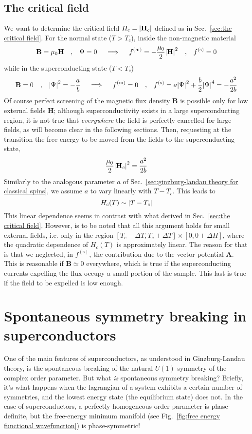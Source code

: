 \subsection{The critical field}

We want to determine the critical field $H_c = \abs{\mathbf{H}_c}$ defined as in Sec.~\ref{sec:the critical field}. For the normal state ($T > T_c$), inside the non-magnetic material
\[
    \mathbf{B} = \mu_0 \mathbf{H}
    \qq{,}
    \Psi = 0
    \quad\implies\quad
    f^{(\mathrm{m})} = - \frac{\mu_0}{2} \abs{\mathbf{H}}^2
    \qq{,}
    f^{(\mathrm{s})} = 0
\]
while in the superconducting state ($T < T_c$)
\[
    \mathbf{B} = 0
    \qq{,}
    \abs{\Psi}^2 = - \frac{a}{b}
    \quad\implies\quad
    f^{(\mathrm{m})} = 0
    \qq{,}
    f^{(\mathrm{s})} = a \abs{\Psi}^2 + \frac{b}{2} \abs{\Psi}^4 = - \frac{a^2}{2b} 
\]
Of course perfect screening of the magnetic flux density $\mathbf{B}$ is possible only for low external fields $\mathbf{H}$; although superconductivity exists in a large superconducting region, it is not true that \textit{everywhere} the field is perfectly cancelled for large fields, as will become clear in the following sections. Then, requesting at the transition the free energy to be moved from the fields to the superconducting state,
\[
     \frac{\mu_0}{2} \abs{\mathbf{H}_c}^2 = \frac{a^2}{2b} 
\]
Similarly to the analogous parameter $a$ of Sec.~\ref{sec:ginzburg-landau theory for classical spins}, we assume $a$ to vary linearly with $T-T_c$. This leads to
\[
    H_c (T) \sim \abs{T-T_c}
\]
This linear dependence seems in contrast with what derived in Sec.~\ref{sec:the critical field}. However, is to be noted that all this argument holds for small external fields, i.e. only in the region $[T_c - \Delta T, T_c + \Delta T] \times [0, 0 + \Delta H]$, where the quadratic dependence of $H_c(T)$ is approximately linear. The reason for that is that we neglected, in $f^{(\mathrm{s})}$, the contribution due to the vector potential $\mathbf{A}$. This is reasonable if $\mathbf{B} \simeq 0$ everywhere, which is true if the superconducting currents expelling the flux occupy a small portion of the sample. This last is true if the field to be expelled is low enough.

\section{Spontaneous symmetry breaking in superconductors}

One of the main features of superconductors, as understood in Ginzburg-Landau theory, is the spontaneous breaking of the natural $U(1)$ symmetry of the complex order parameter. But what \textit{is} spontaneous symmetry breaking? Briefly, it's what happens when the lagrangian of a system exhibits a certain number of symmetries, and the lowest energy state (the equilibrium state) does not. In the case of superconductors, a perfectly homogeneous order parameter is phase-definite, but the free-energy minimum manifold (see Fig.~\ref{fig:free energy functional wavefunction}) is phase-symmetric!


